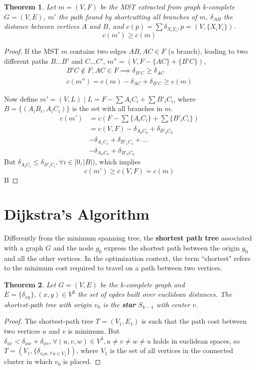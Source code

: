 \documentclass[journal]{IEEEtran}
\newtheorem{theorem}{Theorem}[section]
\begin{document}
\begin{theorem}
	\label{t:sic}
	Let $m=(V, F)$ be the MST extracted from graph k-complete $G=(V, E)$, $m'$ the path found by shortcutting all branches of $m$, $\delta_{AB}$ the distance between vertices $A$ and $B$, and $c(p)=\sum\delta_{X_iY_i}, p = (V, \{X_iY_i\})$.
	$$c(m') \ge c(m)$$
\end{theorem}
\begin{proof}
	If the MST $m$ contains two edges $AB, AC \in F$ (a branch), leading to two different paths $B...B'$ and $C\dots C'$, $m'' = (V, F-\{AC\}+\{B'C\})$,
    \begin{align*}
    B'C \notin F, AC \in F \implies \delta_{B'C} \ge \delta_{AC} \\
    c(m'') = c(m) - \delta_{AC} + \delta_{B'C} \ge c(m)
    \end{align*}
    
	Now define $m' = (V, L) \mid L = F - \sum {A_iC_i} + \sum {B'_iC_i}$, where $B = \{(A_iB_i, A_iC_i)\}$ is the set with all branches in $m$.
    \begin{align*}
    c(m') &= c(F - \sum \{A_iC_i\} + \sum \{B'_iC_i\}) \\
    &= c(V, F)  - \delta_{A_0C_0} + \delta_{B'_0C_0} \\
    &- \delta_{A_1C_1} + \delta_{B'_1C_1} + \dots \\
    &- \delta_{A_nC_n} + \delta_{B'_nC_n}
    \end{align*}
    But $\delta_{A_iC_i} \le \delta_{B'_iC_i}, \forall i\in [0, |B|)$, which implies
	$$c(m') \ge c(V, F) = c(m)$$B
\end{proof}

\section{Dijkstra's Algorithm}

Differently from the minimum spanning tree, the \textbf{shortest path tree} associated with a graph $G$ and the node $g_0$ express the shortest path between the origin $g_0$ and all the other vertices. In the optimization context, the term ``shortest" refers to the minimum cost required to travel on a path between two vertices.

\begin{theorem}
	\label{t:star}
	Let $G=(V, E)$ be the k-complete graph and $E=\{\delta_{xy}\}, (x, y) \in V^2$ the set of egdes built over euclidean distances. The shortest-path tree with origin $v_0$ is the \textbf{star} $S_{k-1}$ with center $v$.
\end{theorem}
\begin{proof}
	The shortest-path tree $T=(V_1, E_1)$ is such that the path cost between two vertices $u$ and $v$ is minimum. But $\delta_{uv} < \delta_{uw} + \delta_{wv}, \forall (u, v, w) \in V^3, u \ne v \ne w \ne u$ holds in euclidean spaces, so $T = (V_1, \{\delta_{v_0u, \forall u \in V_1}\})$, where $V_1$ is the set of all vertices in the connected cluster in which $v_0$ is placed.
\end{proof}
\end{document}
